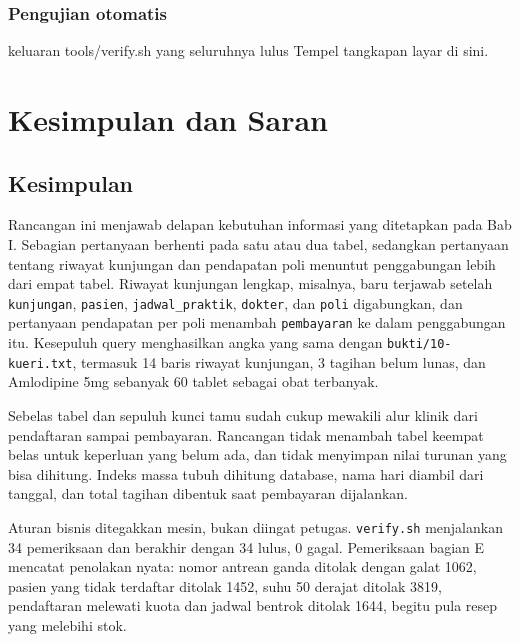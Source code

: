 \documentclass[12pt,a4paper]{article}
\begin{document}
\subsubsection{Pengujian otomatis}
\begin{tangkapanlayar}{keluaran tools/verify.sh yang seluruhnya lulus}
  Tempel tangkapan layar di sini.
\end{tangkapanlayar}

\section{Kesimpulan dan Saran}

\subsection{Kesimpulan}

Rancangan ini menjawab delapan kebutuhan informasi yang ditetapkan pada Bab I.
Sebagian pertanyaan berhenti pada satu atau dua tabel, sedangkan pertanyaan
tentang riwayat kunjungan dan pendapatan poli menuntut penggabungan lebih dari
empat tabel. Riwayat kunjungan lengkap, misalnya, baru terjawab setelah
\texttt{kunjungan}, \texttt{pasien}, \texttt{jadwal\_praktik}, \texttt{dokter},
dan \texttt{poli} digabungkan, dan pertanyaan pendapatan per poli menambah
\texttt{pembayaran} ke dalam penggabungan itu. Kesepuluh query menghasilkan
angka yang sama dengan \texttt{bukti/10-kueri.txt}, termasuk 14 baris riwayat
kunjungan, 3 tagihan belum lunas, dan Amlodipine 5mg sebanyak 60 tablet sebagai
obat terbanyak.

Sebelas tabel dan sepuluh kunci tamu sudah cukup mewakili alur klinik dari
pendaftaran sampai pembayaran. Rancangan tidak menambah tabel keempat belas
untuk keperluan yang belum ada, dan tidak menyimpan nilai turunan yang bisa
dihitung. Indeks massa tubuh dihitung database, nama hari diambil dari tanggal,
dan total tagihan dibentuk saat pembayaran dijalankan.

Aturan bisnis ditegakkan mesin, bukan diingat petugas. \texttt{verify.sh}
menjalankan 34 pemeriksaan dan berakhir dengan 34 lulus, 0 gagal. Pemeriksaan
bagian E mencatat penolakan nyata: nomor antrean ganda ditolak dengan galat
1062, pasien yang tidak terdaftar ditolak 1452, suhu 50 derajat ditolak 3819,
pendaftaran melewati kuota dan jadwal bentrok ditolak 1644, begitu pula resep
yang melebihi stok.
\end{document}
